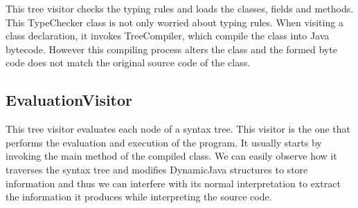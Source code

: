 This tree visitor checks the typing rules and loads the classes, fields and methods. This TypeChecker class is not only worried about typing rules. When visiting a class declaration, it invokes TreeCompiler, which compile the class into Java bytecode. However this compiling process alters the class and the formed byte code does not match the original source code of the class.

\subsection{EvaluationVisitor}

This tree visitor evaluates each node of a syntax tree. This visitor is the one that performs the evaluation and execution of the program. It usually starts by invoking the main method of the compiled class. We can easily observe how it traverses the syntax tree and modifies DynamicJava structures to store information and thus we can interfere with its normal interpretation to extract the information it produces while interpreting the source code.
